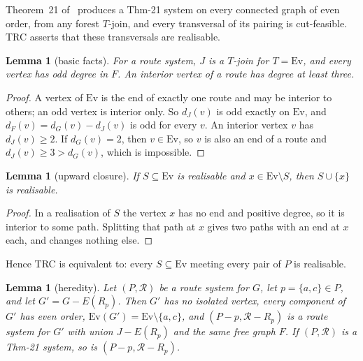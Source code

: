 \documentclass[11pt]{amsart}
\newtheorem{lemma}[theorem]{Lemma}
\theoremstyle{definition}
\newcommand{\Ev}{\mathrm{Ev}}
\newcommand{\cR}{\mathcal R}
\begin{document}
Theorem~21 of~\cite{EMM} produces a Thm-21 system on every connected graph of even order, from any
forest $T$-join, and every transversal of its pairing is cut-feasible. TRC asserts that these
transversals are realisable.

\begin{lemma}[basic facts]\label{lem:basic}
For a route system, $J$ is a $T$-join for $T=\Ev$, and every vertex has odd degree in $F$. An interior
vertex of a route has degree at least three.
\end{lemma}

\begin{proof}
A vertex of $\Ev$ is the end of exactly one route and may be interior to others; an odd vertex is interior
only. So $d_J(v)$ is odd exactly on $\Ev$, and $d_F(v)=d_G(v)-d_J(v)$ is odd for every $v$. An interior
vertex $v$ has $d_J(v)\ge2$. If $d_G(v)=2$, then $v\in\Ev$, so $v$ is also an end of a route and
$d_J(v)\ge3>d_G(v)$, which is impossible.
\end{proof}

\begin{lemma}[upward closure]\label{lem:up}
If $S\subseteq\Ev$ is realisable and $x\in\Ev\setminus S$, then $S\cup\{x\}$ is realisable.
\end{lemma}

\begin{proof}
In a realisation of $S$ the vertex $x$ has no end and positive degree, so it is interior to some path.
Splitting that path at $x$ gives two paths with an end at $x$ each, and changes nothing else.
\end{proof}

Hence TRC is equivalent to: every $S\subseteq\Ev$ meeting every pair of $P$ is realisable.

\begin{lemma}[heredity]\label{lem:hered}
Let $(P,\cR)$ be a route system for $G$, let $p=\{a,c\}\in P$, and let $G'=G-E(R_p)$. Then $G'$ has no
isolated vertex, every component of $G'$ has even order, $\Ev(G')=\Ev\setminus\{a,c\}$, and
$(P-p,\cR-R_p)$ is a route system for $G'$ with union $J-E(R_p)$ and the same free graph $F$. If
$(P,\cR)$ is a Thm-21 system, so is $(P-p,\cR-R_p)$.
\end{lemma}
\end{document}
